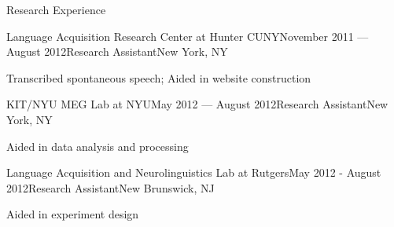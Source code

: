 \documentclass{resume} %
\begin{document}
\begin{rSection}{Research Experience}
\begin{rSubsection}{Language Acquisition Research Center at Hunter CUNY}{November 2011 --- August 2012}{Research Assistant}{New York, NY}
\item Transcribed spontaneous speech; Aided in website construction
\end{rSubsection}

\begin{rSubsection}{KIT/NYU MEG Lab at NYU}{May 2012 --- August 2012}{Research Assistant}{New York, NY}
\item Aided in data analysis and processing
\end{rSubsection}

\begin{rSubsection}{Language Acquisition and Neurolinguistics Lab at Rutgers}{May 2012 - August 2012}{Research Assistant}{New Brunswick, NJ}
\item Aided in experiment design
\end{rSubsection}

\end{rSection}


\vspace{.25cm}
\end{document}
